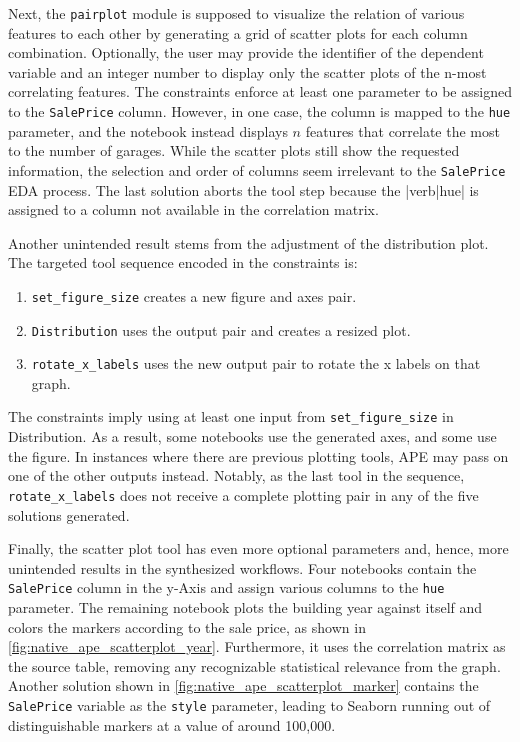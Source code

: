 Next, the \verb|pairplot| module is supposed to visualize the relation of various features to each other by generating a grid of scatter plots for each column combination. Optionally, the user may provide the identifier of the dependent variable and an integer number to display only the scatter plots of the n-most correlating features. The constraints enforce at least one parameter to be assigned to the \verb|SalePrice| column. However, in one case, the column is mapped to the \verb|hue| parameter, and the notebook instead displays \(n\) features that correlate the most to the number of garages. While the scatter plots still show the requested information, the selection and order of columns seem irrelevant to the \verb|SalePrice| EDA process. The last solution aborts the tool step because the |verb|hue| is assigned to a column not available in the correlation matrix.

Another unintended result stems from the adjustment of the distribution plot. The targeted tool sequence encoded in the constraints is:
\begin{enumerate}
    \item \verb|set_figure_size| creates a new figure and axes pair.
    \item \verb|Distribution| uses the output pair and creates a resized plot.
    \item \verb|rotate_x_labels| uses the new output pair to rotate the x labels on that graph.
\end{enumerate}

The constraints imply using at least one input from \verb|set_figure_size| in Distribution. As a result, some notebooks use the generated axes, and some use the figure. In instances where there are previous plotting tools, APE may pass on one of the other outputs instead. Notably, as the last tool in the sequence, \verb|rotate_x_labels| does not receive a complete plotting pair in any of the five solutions generated.

Finally, the scatter plot tool has even more optional parameters and, hence, more unintended results in the synthesized workflows. Four notebooks contain the \verb|SalePrice| column in the y-Axis and assign various columns to the \verb|hue| parameter. The remaining notebook plots the building year against itself and colors the markers according to the sale price, as shown in \autoref{fig:native_ape_scatterplot_year}. Furthermore, it uses the correlation matrix as the source table, removing any recognizable statistical relevance from the graph. Another solution shown in \autoref{fig:native_ape_scatterplot_marker} contains the \verb|SalePrice| variable as the \verb|style| parameter, leading to Seaborn running out of distinguishable markers at a value of around 100,000.

